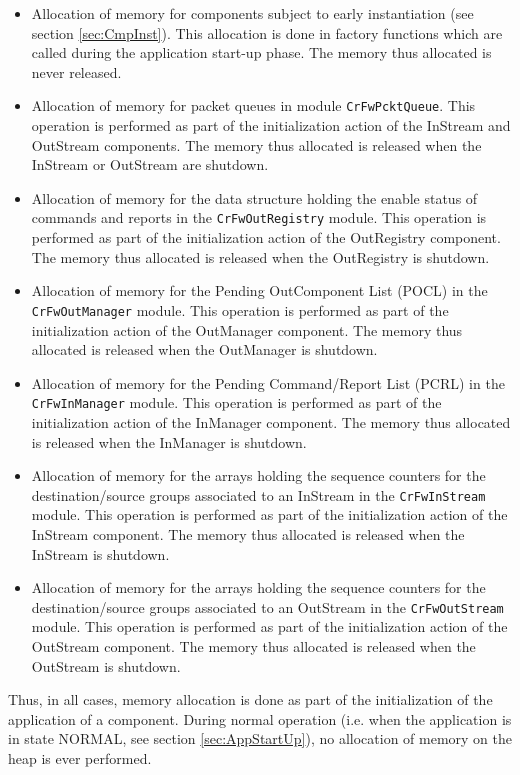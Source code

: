 \documentclass{pnp_article}
\begin{document}
\begin{itemize}
\item Allocation of memory for components subject to early instantiation (see section \ref{sec:CmpInst}). This allocation is done in factory functions which are called during the application start-up phase. The memory thus allocated is never released.
\item Allocation of memory for packet queues in module \texttt{CrFwPcktQueue}. This operation is performed as part of the initialization action of the InStream and OutStream components. The memory thus allocated is released when the InStream or OutStream are shutdown.
\item Allocation of memory for the data structure holding the enable status of commands and reports in the \texttt{CrFwOutRegistry} module. This operation is performed as part of the initialization action of the OutRegistry component. The memory thus allocated is released when the OutRegistry is shutdown.
\item Allocation of memory for the Pending OutComponent List (POCL) in the \texttt{CrFwOutManager} module. This operation is performed as part of the initialization action of the OutManager component. The memory thus allocated is released when the OutManager is shutdown.
\item Allocation of memory for the Pending Command/Report List (PCRL) in the \texttt{CrFwInManager} module. This operation is performed as part of the initialization action of the InManager component. The memory thus allocated is released when the InManager is shutdown.
\item Allocation of memory for the arrays holding the sequence counters for the destination/source groups associated to an InStream in the \texttt{CrFwInStream} module. This operation is performed as part of the initialization action of the InStream component. The memory thus allocated is released when the InStream is shutdown.
\item Allocation of memory for the arrays holding the sequence counters for the destination/source groups associated to an OutStream in the \texttt{CrFwOutStream} module. This operation is performed as part of the initialization action of the OutStream component. The memory thus allocated is released when the OutStream is shutdown.
\end{itemize}

Thus, in all cases, memory allocation is done as part of the initialization of the application of a component. During normal operation (i.e. when the application is in state NORMAL, see section \ref{sec:AppStartUp}), no allocation of memory on the heap is ever performed.
\end{document}
